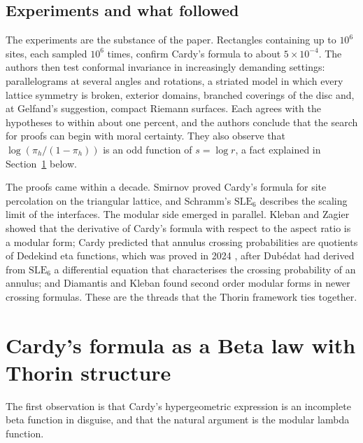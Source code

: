 \subsection{Experiments and what followed}

The experiments are the substance of the paper. Rectangles containing up to $10^6$ sites, each sampled $10^6$ times, confirm Cardy's formula to about $5\times10^{-4}$. The authors then test conformal invariance in increasingly demanding settings: parallelograms at several angles and rotations, a striated model in which every lattice symmetry is broken, exterior domains, branched coverings of the disc and, at Gelfand's suggestion, compact Riemann surfaces. Each agrees with the hypotheses to within about one percent, and the authors conclude that the search for proofs can begin with moral certainty. They also observe that $\log(\pi_h/(1-\pi_h))$ is an odd function of $s = \log r$, a fact explained in Section~\ref{perc:sec:beta} below.

The proofs came within a decade. Smirnov \cite{smirnov2001} proved Cardy's formula for site percolation on the triangular lattice, and Schramm's $\mathrm{SLE}_6$ describes the scaling limit of the interfaces. The modular side emerged in parallel. Kleban and Zagier \cite{klebanzagier2003} showed that the derivative of Cardy's formula with respect to the aspect ratio is a modular form; Cardy \cite{cardy2002,cardy2006} predicted that annulus crossing probabilities are quotients of Dedekind eta functions, which was proved in 2024 \cite{sxz2024}, after Dubédat \cite{dubedat2004} had derived from $\mathrm{SLE}_6$ a differential equation that characterises the crossing probability of an annulus; and Diamantis and Kleban \cite{diamantiskleban2009} found second order modular forms in newer crossing formulas. These are the threads that the Thorin framework ties together.

\section{Cardy's formula as a Beta law with Thorin structure}\label{perc:sec:beta}

The first observation is that Cardy's hypergeometric expression is an incomplete beta function in disguise, and that the natural argument is the modular lambda function.

